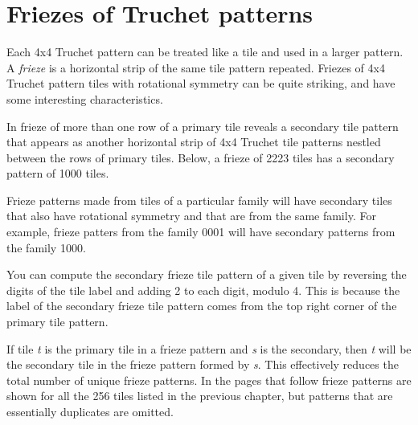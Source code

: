 \documentclass{tufte-book}
\begin{document}


% 
% 
\chapter{Friezes of Truchet patterns}

\noindent
Each 4x4 Truchet pattern can be treated like a tile and used in a larger pattern. A \textit{frieze} is a horizontal strip of the same tile pattern repeated. Friezes of 4x4 Truchet pattern tiles with rotational symmetry can be quite striking, and have some interesting characteristics. 

\vspace{0.5cm}
\noindent
In frieze of more than one row of a primary tile reveals a secondary tile pattern that appears as another horizontal strip of 4x4 Truchet tile patterns nestled between the rows of primary tiles. Below, a frieze of 2223 tiles has a secondary pattern of 1000 tiles.
\,

\vspace{0.5cm}


\vspace{0.5cm}
\noindent
Frieze patterns made from tiles of a particular family will have secondary tiles that also have rotational symmetry and that are from the same family. For example, frieze patters from the family 0001 will have secondary patterns from the family 1000. 
\marginnote{\centering} 

\vspace{0.5cm}
\noindent
You can compute the secondary frieze tile pattern of a given tile by reversing the digits of the tile label and adding 2 to each digit, modulo 4. This is because the label of the secondary frieze tile pattern comes from the top right corner of the primary tile pattern. 

\vspace{0.5cm}
\noindent
If tile \textit{t} is the primary tile in a frieze pattern and \textit{s} is the secondary, then \textit{t} will be the secondary tile in the frieze pattern formed by \textit{s}. This effectively reduces the total number of unique frieze patterns. In the pages that follow frieze patterns are shown for all the 256 tiles listed in the previous chapter, but patterns that are essentially duplicates are omitted.
\newpage



\backmatter
\nocite{*}


\end{document}
